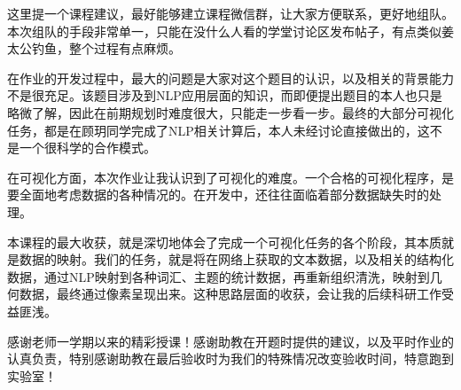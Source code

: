 \documentclass[a4paper,12pt]{article}
\begin{document}
    这里提一个课程建议，最好能够建立课程微信群，让大家方便联系，更好地组队。本次组队的手段非常单一，只能在没什么人看的学堂讨论区发布帖子，有点类似姜太公钓鱼，整个过程有点麻烦。

    在作业的开发过程中，最大的问题是大家对这个题目的认识，以及相关的背景能力不是很充足。该题目涉及到NLP应用层面的知识，而即便提出题目的本人也只是略微了解，因此在前期规划时难度很大，只能走一步看一步。最终的大部分可视化任务，都是在顾玥同学完成了NLP相关计算后，本人未经讨论直接做出的，这不是一个很科学的合作模式。

    在可视化方面，本次作业让我认识到了可视化的难度。一个合格的可视化程序，是要全面地考虑数据的各种情况的。在开发中，还往往面临着部分数据缺失时的处理。

    本课程的最大收获，就是深切地体会了完成一个可视化任务的各个阶段，其本质就是数据的映射。我们的任务，就是将在网络上获取的文本数据，以及相关的结构化数据，通过NLP映射到各种词汇、主题的统计数据，再重新组织清洗，映射到几何数据，最终通过像素呈现出来。这种思路层面的收获，会让我的后续科研工作受益匪浅。

    感谢老师一学期以来的精彩授课！感谢助教在开题时提供的建议，以及平时作业的认真负责，特别感谢助教在最后验收时为我们的特殊情况改变验收时间，特意跑到实验室！
    \label{applastpage}
\iffalse
\begin{itemize}[noitemsep,topsep=0pt]
\end{itemize}
\begin{enumerate}[label=\Roman{*}.,noitemsep,topsep=0pt]
\end{enumerate}
\begin{multicols}{2}
\end{multicols}
\fi
\end{document}
